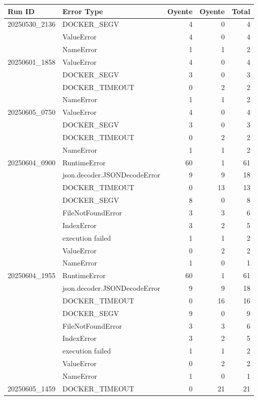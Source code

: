 \documentclass{article}
\newcommand\OY{Oyente}
\newcommand\OYp{\OY\raisebox{0.3ex}{\smaller +}}
\newcommand\CGTrbcA{20250530\_2136}%
\newcommand\CGTrbcB{20250601\_1858}%
\newcommand\CGTrbcC{20250605\_0750}%
\newcommand\CGTsscA{20250604\_0900}%
\newcommand\CGTsscB{20250604\_1955}%
\newcommand\SKCrbcA{20250605\_1459}%
\begin{document}
	\begin{table}[ht]
		\centering
		\scriptsize
		\begin{tabular}{llrrr}
			\toprule
			\textbf{Run ID}   & \textbf{Error Type}
			& \textbf{\OY} & \textbf{\OYp} & \textbf{Total} \\
			\midrule
			\CGTrbcA & DOCKER\_SEGV & 4 & 0 & 4 \\
			& ValueError & 4 & 0 & 4 \\
			& NameError & 1 & 1 & 2 \\[3pt]
			\CGTrbcB & ValueError & 4 & 0 & 4 \\
			& DOCKER\_SEGV & 3 & 0 & 3 \\
			& DOCKER\_TIMEOUT & 0 & 2 & 2 \\
			& NameError & 1 & 1 & 2 \\[3pt]
			\CGTrbcC & ValueError & 4 & 0 & 4 \\
			& DOCKER\_SEGV & 3 & 0 & 3 \\
			& DOCKER\_TIMEOUT & 0 & 2 & 2 \\
			& NameError & 1 & 1 & 2 \\[3pt]
			\CGTsscA & RuntimeError & 60 & 1 & 61 \\
			& json.decoder.JSONDecodeError & 9 & 9 & 18 \\
			& DOCKER\_TIMEOUT & 0 & 13 & 13 \\
			& DOCKER\_SEGV & 8 & 0 & 8 \\
			& FileNotFoundError & 3 & 3 & 6 \\
			& IndexError & 3 & 2 & 5 \\
			& execution failed & 1 & 1 & 2 \\
			& ValueError & 0 & 2 & 2 \\
			& NameError & 1 & 0 & 1 \\[3pt]
			\CGTsscB & RuntimeError & 60 & 1 & 61 \\
			& json.decoder.JSONDecodeError & 9 & 9 & 18 \\
			& DOCKER\_TIMEOUT & 0 & 16 & 16 \\
			& DOCKER\_SEGV & 9 & 0 & 9 \\
			& FileNotFoundError & 3 & 3 & 6 \\
			& IndexError & 3 & 2 & 5 \\
			& execution failed & 1 & 1 & 2 \\
			& ValueError & 0 & 2 & 2 \\
			& NameError & 1 & 0 & 1 \\[3pt]
			\SKCrbcA & DOCKER\_TIMEOUT & 0 & 21 & 21 \\

\end{tabular}
\end{table}
\end{document}
